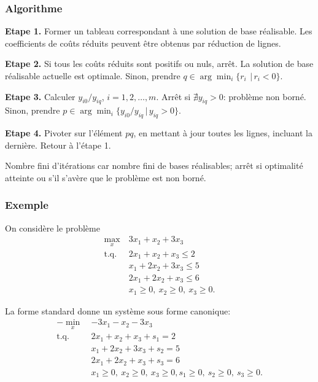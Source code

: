 \documentclass[t,usepdftitle=false]{beamer}
\begin{document}
\begin{frame}
\frametitle{Algorithme}

\textbf{Etape 1.}
Former un tableau correspondant à une solution de base réalisable. Les coefficients de coûts réduits peuvent être obtenus par réduction de lignes.

\mbox{}

\textbf{Etape 2.}
Si tous les coûts réduits sont positifs ou nuls, arrêt. La solution de base réalisable actuelle est optimale. Sinon, prendre $q \in \arg\min_i \{ r_i\ \,|\, r_i < 0 \}$.

\mbox{}

\textbf{Etape 3.}
Calculer $y_{i0}/y_{iq}$, $i = 1, 2, \ldots, m$. Arrêt si $\nexists y_{iq} > 0$: problème non borné. Sinon, prendre $p \in \arg\min_i \{ y_{i0}/y_{iq} \,|\, y_{iq} > 0 \}$. %

\mbox{}

\textbf{Etape 4.} Pivoter sur l'élément $pq$, en mettant à jour toutes les lignes, incluant la dernière. Retour à l'étape 1.

\mbox{}

Nombre fini d'itérations car nombre fini de bases réalisables; arrêt si optimalité atteinte ou s'il s'avère que le problème est non borné.

\end{frame}

\begin{frame}
\frametitle{Exemple}

On considère le problème
\begin{align*}
\max_x\ & 3x_1 + x_2 +3x_3 \\
\mbox{t.q. } & 2x_1 + x_2 + x_3 \leq 2 \\
& x_1 + 2x_2 + 3x_3 \leq 5 \\
& 2x_1 + 2x_2 + x_3 \leq 6 \\
& x_1 \geq 0,\ x_2 \geq 0,\ x_3 \geq 0.
\end{align*}

La forme standard donne un système sous forme canonique:
\begin{align*}
- \min_x\ & -3x_1 - x_2 - 3x_3 \\
\mbox{t.q. } & 2x_1 + x_2 + x_3 + s_1 = 2 \\
& x_1 + 2x_2 + 3x_3 + s_2 = 5 \\
& 2x_1 + 2x_2 + x_3 + s_3 = 6 \\
& x_1 \geq 0,\ x_2 \geq 0,\ x_3 \geq 0, s_1 \geq 0,\ s_2 \geq 0,\ s_3 \geq 0.
\end{align*}

\end{frame}
\end{document}
